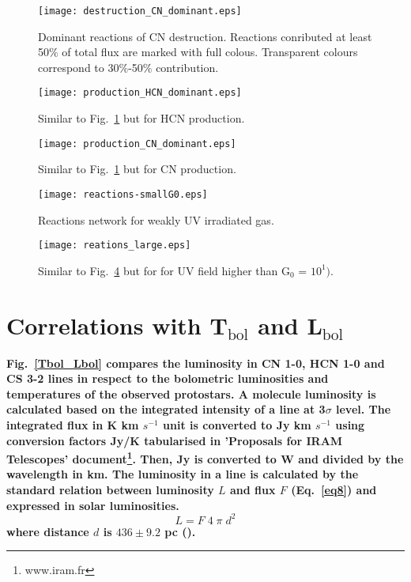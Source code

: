 \documentclass{aa}
\begin{document}
\begin{appendix}
\begin{figure} \texttt{[image: destruction\_CN\_dominant.eps]} \caption{Dominant reactions
of CN destruction. Reactions conributed at least 50$\%$ of total flux are marked with full colous.
Transparent colours correspond to 30$\%$-50$\%$ contribution.} \label{CN_dest} \end{figure}

\begin{figure} 
\texttt{[image: production\_HCN\_dominant.eps]} 
\caption{Similar to Fig.~\ref{CN_dest} but for HCN production.} 
\label{HCN_prod} 
\end{figure}

\begin{figure} 
\texttt{[image: production\_CN\_dominant.eps]} 
\caption{Similar to Fig.~\ref{CN_dest} but for CN production.} 
\label{CN_prod}
\end{figure}


\begin{figure} 
\texttt{[image: reactions-smallG0.eps]} 
\caption{Reactions network for weakly UV irradiated gas.} 
\label{reactions_smallG0} 
\end{figure}

\begin{figure} 
\texttt{[image: reations\_large.eps]} 
\caption{Similar to Fig.~\ref{reactions_smallG0} but for for UV field higher than G$_0$ = $10^{1})$.}
\label{reactions_largeG0} 
\end{figure}


\section{Correlations with T$_\mathrm{bol}$ and L$_\mathrm{bol}$} 

\textbf{Fig.~\ref{Tbol_Lbol} compares the luminosity in CN 1-0, HCN 1-0 and CS 3-2 lines in respect to the bolometric luminosities and temperatures of the observed protostars. A molecule luminosity is calculated based on the integrated intensity of a line at 3$\sigma$ level. The integrated flux in K km $s^{-1}$ unit is converted to Jy km $s^{-1}$ using conversion factors Jy/K tabularised in 'Proposals for IRAM Telescopes' document\footnote{www.iram.fr}. Then, Jy is converted to W and divided by the wavelength in km. The luminosity in a line is calculated by the standard relation between luminosity $L$ and flux $F$ (Eq.~\ref{eq8}) and expressed in solar luminosities.}
\begin{equation} 
\label{eq8} 
L = F \; 4 \; \pi \; d^{2}
\end{equation}
\textbf{where distance $d$ is $436 \pm 9.2$ pc (\citealt{Ort17}).}


\end{appendix}
\end{document}

